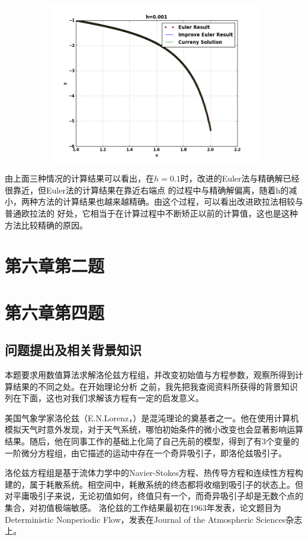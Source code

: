 \documentclass[10pt,a4paper]{ctexart}
\begin{document}
\par
\par
\centerline{\includegraphics[height=7cm,width=14cm]{0.001h.png}}
\par
由上面三种情况的计算结果可以看出，在$h=0.1$时，改进的Euler法与精确解已经很靠近，但Euler法的计算结果在靠近右端点
的过程中与精确解偏离，随着h的减小，两种方法的计算结果也越来越精确。由这个过程，可以看出改进欧拉法相较与普通欧拉法的
好处，它相当于在计算过程中不断矫正以前的计算值，这也是这种方法比较精确的原因。
\section{第六章第二题}
\section{第六章第四题}
\subsection{问题提出及相关背景知识}
本题要求用数值算法求解洛伦兹方程组，并改变初始值与方程参数，观察所得到计算结果的不同之处。在开始理论分析
之前，我先把我查阅资料所获得的背景知识列在下面，这也对我们求解该方程有一定的启发意义。

美国气象学家洛伦兹（E.N.Lorenz，）是混沌理论的奠基者之一。他在使用计算机模拟天气时意外发现，对于天气系统，哪怕初始条件的微小改变也会显著影响运算结果。随后，他在同事工作的基础上化简了自己先前的模型，得到了有3个变量的一阶微分方程组，由它描述的运动中存在一个奇异吸引子，即洛伦兹吸引子。

洛伦兹方程组是基于流体力学中的Navier-Stokes方程、热传导方程和连续性方程构建的，属于耗散系统。相空间中，耗散系统的终态都将收缩到吸引子的状态上。但对平庸吸引子来说，无论初值如何，终值只有一个，而奇异吸引子却是无数个点的集合，对初值极端敏感。
洛伦兹的工作结果最初在1963年发表，论文题目为Deterministic Nonperiodic Flow，发表在Journal of the Atmospheric Sciences杂志上。
\end{document}
